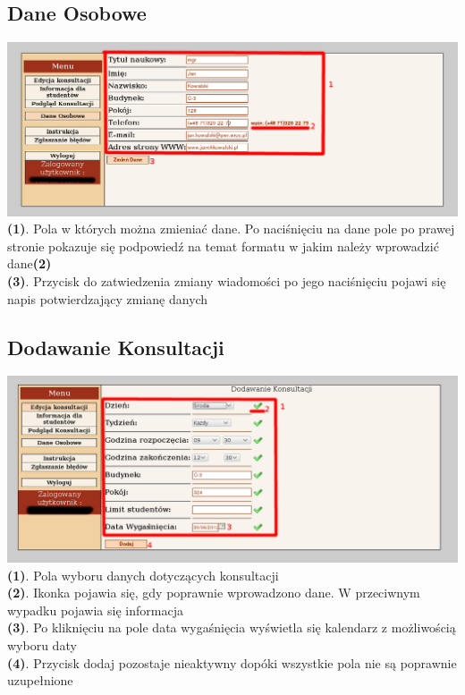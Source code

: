 \documentclass[12pt]{article} %
\begin{document}
\subsection{Dane Osobowe}
\includegraphics[width=1\textwidth]{instr5.png}\\
\textbf {(1)}. Pola w których można zmieniać dane. Po naciśnięciu na dane pole
po prawej stronie pokazuje się podpowiedź na temat formatu w jakim należy
wprowadzić dane\textbf {(2)}\\
\textbf {(3)}. Przycisk do zatwiedzenia zmiany wiadomości po jego naciśnięciu
pojawi się napis potwierdzający zmianę danych\\


\subsection{Dodawanie Konsultacji}
\includegraphics[width=1\textwidth]{instr6.png}\\
\textbf {(1)}. Pola wyboru danych dotyczących konsultacji\\
\textbf {(2)}. Ikonka pojawia się, gdy poprawnie wprowadzono dane. W przeciwnym
wypadku pojawia się informacja
\\
\textbf {(3)}. Po kliknięciu na pole data wygaśnięcia wyświetla się kalendarz z możliwością wyboru daty \\
\textbf {(4)}. Przycisk dodaj pozostaje nieaktywny dopóki wszystkie pola nie są poprawnie uzupełnione\\
\end{document}
